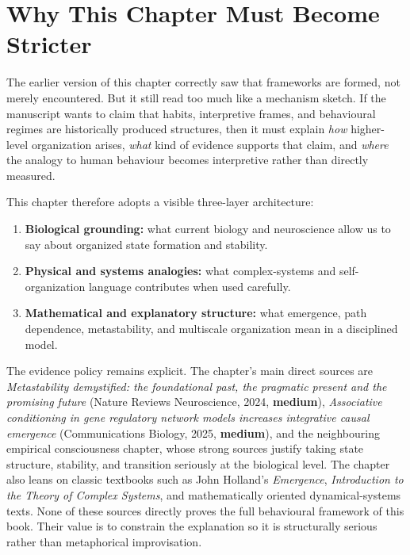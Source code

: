 \section{Why This Chapter Must Become Stricter}

The earlier version of this chapter correctly saw that frameworks are formed,
not merely encountered. But it still read too much like a mechanism sketch. If
the manuscript wants to claim that habits, interpretive frames, and behavioural
regimes are historically produced structures, then it must explain
\emph{how} higher-level organization arises, \emph{what} kind of evidence
supports that claim, and \emph{where} the analogy to human behaviour becomes
interpretive rather than directly measured.

This chapter therefore adopts a visible three-layer architecture:
\begin{enumerate}[nosep]
  \item \textbf{Biological grounding:} what current biology and neuroscience
        allow us to say about organized state formation and stability.
  \item \textbf{Physical and systems analogies:} what complex-systems and
        self-organization language contributes when used carefully.
  \item \textbf{Mathematical and explanatory structure:} what emergence,
        path dependence, metastability, and multiscale organization mean in a
        disciplined model.
\end{enumerate}

The evidence policy remains explicit. The chapter's main direct sources are
\emph{Metastability demystified: the foundational past, the pragmatic present
and the promising future} (Nature Reviews Neuroscience, 2024, \textbf{medium}),
\emph{Associative conditioning in gene regulatory network models increases
integrative causal emergence} (Communications Biology, 2025, \textbf{medium}),
and the neighbouring empirical consciousness chapter, whose strong sources
justify taking state structure, stability, and transition seriously at the
biological level. The chapter also leans on classic textbooks such as John
Holland's \emph{Emergence}, \emph{Introduction to the Theory of Complex
Systems}, and mathematically oriented dynamical-systems texts. None of these
sources directly proves the full behavioural framework of this book. Their
value is to constrain the explanation so it is structurally serious rather than
metaphorical improvisation.
